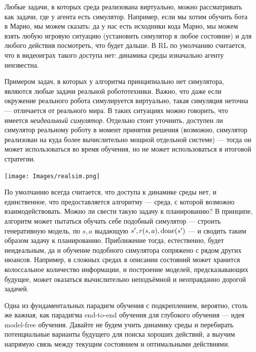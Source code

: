 \begin{example}
Любые задачи, в которых среда реализована виртуально, можно рассматривать как задачи, где у агента есть симулятор. Например, если мы хотим обучить бота в Марио, мы можем сказать: да у нас есть исходники кода Марио, мы можем взять любую игровую ситуацию (установить симулятор в любое состояние) и для любого действия посмотреть, что будет дальше. В RL по умолчанию считается, что в видеоиграх такого доступа нет: динамика среды изначально агенту неизвестна.
\end{example}

\begin{exampleBox}[righthand ratio=0.3, sidebyside, sidebyside align=center, lower separated=false]{}
Примером задач, в которых у алгоритма принципиально нет симулятора, являются любые задачи реальной робототехники. Важно, что даже если окружение реального робота симулируется виртуально, такая симуляция неточна --- отличается от реального мира. В таких ситуациях можно говорить, что имеется \emph{неидеальный симулятор}. Отдельно стоит уточнить, доступен ли симулятор реальному роботу в момент принятия решения (возможно, симулятор реализован на куда более вычислительно мощной отдельной системе) --- тогда он может использоваться во время обучения, но не может использоваться в итоговой стратегии.

\tcblower
\texttt{[image: Images/realsim.png]}
\end{exampleBox}

По умолчанию всегда считается, что доступа к динамике среды нет, и единственное, что предоставляется алгоритму --- среда, с которой возможно взаимодействовать. Можно ли свести такую задачу к планированию? В принципе, алгоритм может пытаться обучать себе подобный симулятор --- строить генеративную модель, по $s, a$ выдающую $s', r(s, a), \mathrm{done}(s')$ --- и сводить таким образом задачу к планированию. Приближение тогда, естественно, будет неидеальным, да и обучение подобного симулятора сопряжено с рядом других нюансов. Например, в сложных средах в описании состояний может хранится колоссальное количество информации, и построение моделей, предсказывающих будущее, может оказаться вычислительно неподъёмной и неоправданно дорогой задачей. 

Одна из фундаментальных парадигм обучения с подкреплением, вероятно, столь же важная, как парадигма end-to-end обучения для глубокого обучения --- идея model-free обучения. Давайте не будем учить динамику среды и перебирать потенциальные варианты будущего для поиска хороших действий, а выучим напрямую связь между текущим состоянием и оптимальными действиями.

